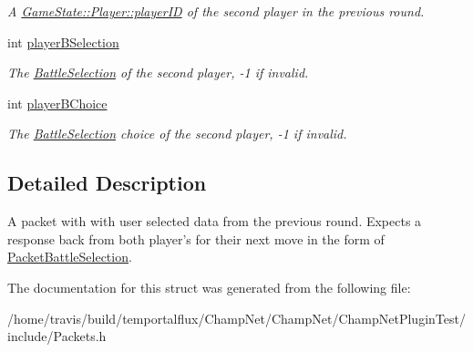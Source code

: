 \begin{DoxyCompactItemize}
\begin{DoxyCompactList}\small\item\em A \hyperlink{class_game_state_1_1_player_acbd28d89e6eb8611aa66452ec31e9133}{Game\-State\-::\-Player\-::player\-I\-D} of the second player in the previous round. \end{DoxyCompactList}\item 
\hypertarget{struct_packet_battle_prompt_selection_aa696c396d478697bdddf8c2394c1a0b7}{int \hyperlink{struct_packet_battle_prompt_selection_aa696c396d478697bdddf8c2394c1a0b7}{player\-B\-Selection}}\label{struct_packet_battle_prompt_selection_aa696c396d478697bdddf8c2394c1a0b7}

\begin{DoxyCompactList}\small\item\em The \hyperlink{group__server_ga729fc596fd91937095a8172eb71be582}{Battle\-Selection} of the second player, -\/1 if invalid. \end{DoxyCompactList}\item 
\hypertarget{struct_packet_battle_prompt_selection_a68ff044c6f22f9aaaeb3aa2a8d12e2eb}{int \hyperlink{struct_packet_battle_prompt_selection_a68ff044c6f22f9aaaeb3aa2a8d12e2eb}{player\-B\-Choice}}\label{struct_packet_battle_prompt_selection_a68ff044c6f22f9aaaeb3aa2a8d12e2eb}

\begin{DoxyCompactList}\small\item\em The \hyperlink{group__server_ga729fc596fd91937095a8172eb71be582}{Battle\-Selection} choice of the second player, -\/1 if invalid. \end{DoxyCompactList}\end{DoxyCompactItemize}


\subsection{Detailed Description}
A packet with with user selected data from the previous round. Expects a response back from both player's for their next move in the form of \hyperlink{struct_packet_battle_selection}{Packet\-Battle\-Selection}. 

The documentation for this struct was generated from the following file\-:\begin{DoxyCompactItemize}
\item 
/home/travis/build/temportalflux/\-Champ\-Net/\-Champ\-Net/\-Champ\-Net\-Plugin\-Test/include/Packets.\-h\end{DoxyCompactItemize}
